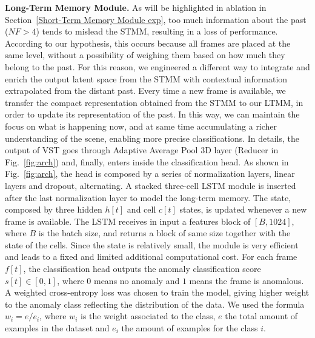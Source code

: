 \noindent\textbf{Long-Term Memory Module.}
\label{Long-Term Memory Module descr}
As will be highlighted in ablation in Section~\ref{Short-Term Memory Module exp}, too much information about the past ($\mathit{NF} > 4$) tends to mislead the STMM, resulting in a loss of performance.
According to our hypothesis, this occurs because all frames are placed at the same level, without a possibility of weighing them based on how much they belong to the past.
For this reason, we engineered a different way to integrate and enrich the output latent space from the STMM with contextual information extrapolated from the distant past.
Every time a new frame is available, we transfer the compact representation obtained from the STMM to our LTMM, in order to update its representation of the past.
In this way, we can maintain the focus on what is happening now, and at same time accumulating a richer understanding of the scene, enabling more precise classifications.
In details, the output of VST goes through Adaptive Average Pool 3D layer (Reducer in Fig.~\ref{fig:arch}) and, finally, enters inside the classification head.
As shown in Fig.~\ref{fig:arch}, the head is composed by a series of normalization layers, linear layers and dropout, alternating. 
A stacked three-cell LSTM module is inserted after the last normalization layer to model the long-term memory.
The state, composed by three hidden $h[t]$ and cell $c[t]$ states, is updated whenever a new frame is available.
The LSTM receives in input a features block of $[B, 1024]$, where $B$ is the batch size, and returns a block of same size together with the state of the cells.
Since the state is relatively small, the module is very efficient and leads to a fixed and limited additional computational cost.
For each frame $f[t]$, the classification head outputs the anomaly classification score $s[t] \in [0,1]$, where $0$ means no anomaly and $1$ means the frame is anomalous.
A weighted cross-entropy loss was chosen to train the model, giving higher weight to the anomaly class reflecting the distribution of the data.
We used the formula $w_i = e / e_i$, where $w_i$ is the weight associated to the class, $e$ the total amount of examples in the dataset and $e_i$ the amount of examples for the class $i$.

